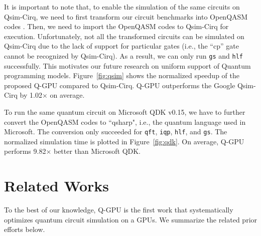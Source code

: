 It is important to note that, to enable the simulation of the same circuits on Qsim-Cirq, we need to first transform our circuit benchmarks into  OpenQASM codes \cite{10.48550/arXiv.1707.03429}. Then, we need to import the OpenQASM codes to Qsim-Cirq for execution. Unfortunately, not all the transformed circuits can be simulated on Qsim-Cirq due to the lack of support for particular gates (i.e., the ``cp'' gate cannot be recognized by Qsim-Cirq). As a result, we can only run  {\tt gs} and {\tt hlf} successfully. This motivates our future research on uniform support of Quantum programming models. Figure~\ref{fig:qsim} shows the normalized speedup of the proposed Q-GPU compared to Qsim-Cirq. Q-GPU outperforms the Google Qsim-Cirq by 1.02$\times$ on average. 

To run the same quantum circuit on Microsoft QDK v0.15, we have to further convert the OpenQASM codes to ``qsharp", i.e., the quantum language used in Microsoft. The conversion only succeeded for {\tt qft}, {\tt iqp}, {\tt hlf}, and {\tt gs}. The normalized simulation time is plotted in Figure~\ref{fig:qdk}. On average, Q-GPU performs 9.82$\times$ better than Microsoft QDK. 

\section{Related Works}
\label{sec:related}
To the best of our knowledge, Q-GPU is the first work that systematically optimizes quantum circuit simulation on a GPUs. We summarize the related prior efforts below.

